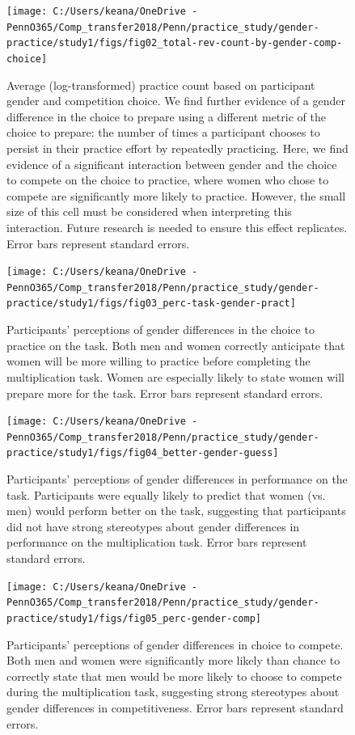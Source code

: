 \documentclass[a4paper, nobind]{templates/ociamthesis}
\begin{document}
\begin{figure}
\texttt{[image: C:/Users/keana/OneDrive - PennO365/Comp\_transfer2018/Penn/practice\_study/gender-practice/study1/figs/fig02\_total-rev-count-by-gender-comp-choice]} \caption{Average (log-transformed) practice count based on participant gender and competition choice. We find further evidence of a gender difference in the choice to prepare using a different metric of the choice to prepare: the number of times a participant chooses to persist in their practice effort by repeatedly practicing. Here, we find evidence of a significant interaction between gender and the choice to compete on the choice to practice, where women who chose to compete are significantly more likely to practice. However, the small size of this cell must be considered when interpreting this interaction. Future research is needed to ensure this effect replicates. Error bars represent standard errors.}\label{fig:s102}
\end{figure}

\begin{figure}
\texttt{[image: C:/Users/keana/OneDrive - PennO365/Comp\_transfer2018/Penn/practice\_study/gender-practice/study1/figs/fig03\_perc-task-gender-pract]} \caption{Participants' perceptions of gender differences in the choice to practice on the task. Both men and women correctly anticipate that women will be more willing to practice before completing the multiplication task. Women are especially likely to state women will prepare more for the task. Error bars represent standard errors.}\label{fig:s103}
\end{figure}

\begin{figure}
\texttt{[image: C:/Users/keana/OneDrive - PennO365/Comp\_transfer2018/Penn/practice\_study/gender-practice/study1/figs/fig04\_better-gender-guess]} \caption{Participants' perceptions of gender differences in performance on the task. Participants were equally likely to predict that women (vs. men) would perform better on the task, suggesting that participants did not have strong stereotypes about gender differences in performance on the multiplication task. Error bars represent standard errors.}\label{fig:s104}
\end{figure}

\begin{figure}
\texttt{[image: C:/Users/keana/OneDrive - PennO365/Comp\_transfer2018/Penn/practice\_study/gender-practice/study1/figs/fig05\_perc-gender-comp]} \caption{Participants' perceptions of gender differences in choice to compete. Both men and women were significantly more likely than chance to correctly state that men would be more likely to choose to compete during the multiplication task, suggesting strong stereotypes about gender differences in competitiveness. Error bars represent standard errors.}\label{fig:s105}
\end{figure}
\end{document}
